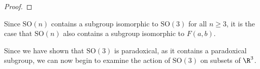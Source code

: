 \begin{proof}
\end{proof}
\begin{remark}
  Since $\text{SO}(n)$ contains a subgroup isomorphic to $\text{SO}(3)$ for all $n\geq 3$, it is the case that $\text{SO}(n)$ also contains a subgroup isomorphic to $F(a,b)$.
\end{remark}
Since we have shown that $\text{SO}(3)$ is paradoxical, as it contains a paradoxical subgroup, we can now begin to examine the action of $\text{SO}(3)$ on subsets of $\R^3$.
